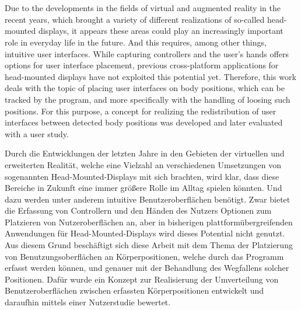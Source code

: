 \chapter{\abstractname}


Due to the developments in the fields of virtual and augmented reality in the recent years, which brought a variety of different realizations of so-called head-mounted displays, it appears these areas could play an increasingly important role in everyday life in the future. And this requires, among other things, intuitive user interfaces. While capturing controllers and the user's hands offers options for user interface placement, previous cross-platform applications for head-mounted displays have not exploited this potential yet.
Therefore, this work deals with the topic of placing user interfaces on body positions, which can be tracked by the program, and more specifically with the handling of loosing such positions. For this purpose, a concept for realizing the redistribution of user interfaces between detected body positions was developed and later evaluated with a user study.

\vspace{0.5in}

\noindent %

Durch die Entwicklungen der letzten Jahre in den Gebieten der virtuellen und erweiterten Realität, welche eine Vielzahl an verschiedenen Umsetzungen von sogenannten Head-Mounted-Displays mit sich brachten, wird klar, dass diese Bereiche in Zukunft eine immer größere Rolle im Alltag spielen könnten. Und dazu werden unter anderem intuitive Benutzeroberflächen benötigt. Zwar bietet die Erfassung von Controllern und den Händen des Nutzers Optionen zum Platzieren von Nutzeroberflächen an, aber in bisherigen plattformübergreifenden Anwendungen für Head-Mounted-Displays wird dieses Potential nicht genutzt.
Aus diesem Grund beschäftigt sich diese Arbeit mit dem Thema der Platzierung von Benutzungsoberflächen an Körperpositionen, welche durch das Programm erfasst werden können, und genauer mit der Behandlung des Wegfallens solcher Positionen. Dafür wurde ein Konzept zur Realisierung der Umverteilung von Benutzeroberflächen zwischen erfassten Körperpositionen entwickelt und daraufhin mittels einer Nutzerstudie bewertet.


\makeatletter
{}
{\renewcommand{\abstractname}{Zusammenfassung}}
{\renewcommand{\abstractname}{Abstract}}
\makeatother



\makeatletter
{}
{\renewcommand{\abstractname}{Abstract}}
{\renewcommand{\abstractname}{Zusammenfassung}}
\makeatother